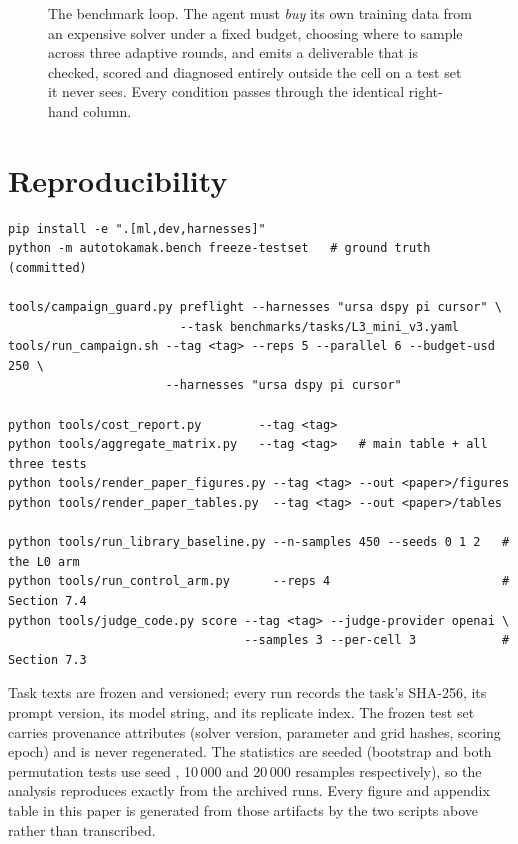 \begin{figure}[htbp]
{%
}
\caption{The benchmark loop. The agent must \emph{buy} its own training data from
an expensive \GS{} solver under a fixed budget, choosing where to sample across
three adaptive rounds, and emits a deliverable that is checked, scored and
diagnosed entirely outside the cell on a test set it never sees. Every
condition passes through the identical right-hand column.}
\label{fig:loop}
\end{figure}


\section{Reproducibility}
\label{app:repro}

{\small
\begin{verbatim}
pip install -e ".[ml,dev,harnesses]"
python -m autotokamak.bench freeze-testset   # ground truth (committed)

tools/campaign_guard.py preflight --harnesses "ursa dspy pi cursor" \
                        --task benchmarks/tasks/L3_mini_v3.yaml
tools/run_campaign.sh --tag <tag> --reps 5 --parallel 6 --budget-usd 250 \
                      --harnesses "ursa dspy pi cursor"

python tools/cost_report.py        --tag <tag>
python tools/aggregate_matrix.py   --tag <tag>   # main table + all three tests
python tools/render_paper_figures.py --tag <tag> --out <paper>/figures
python tools/render_paper_tables.py  --tag <tag> --out <paper>/tables

python tools/run_library_baseline.py --n-samples 450 --seeds 0 1 2   # the L0 arm
python tools/run_control_arm.py      --reps 4                        # Section 7.4
python tools/judge_code.py score --tag <tag> --judge-provider openai \
                                 --samples 3 --per-cell 3            # Section 7.3
\end{verbatim}
}

Task texts are frozen and versioned; every run records the task's SHA-256, its
prompt version, its model string, and its replicate index. The frozen test set
carries provenance attributes (solver version, parameter and grid hashes,
scoring epoch) and is never regenerated. The statistics are seeded
(bootstrap and both permutation tests use seed \code{20260917}, 10\,000 and
20\,000 resamples respectively), so the analysis reproduces exactly from the
archived runs. Every figure and appendix table in this paper is generated from
those artifacts by the two scripts above rather than transcribed.


